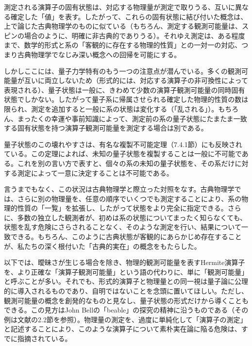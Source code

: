 測定される演算子の固有状態は、対応する物理量が測定で取りうる、互いに異なる確定した「値」を表す。したがって、これらの固有状態に結び付いた概念は、上で論じた古典物理学のものに似ている（もちろん、測定する観測可能量は、スピンの場合のように、明確に非古典的でありうる）。それゆえ測定は、ある程度まで、数学的形式と系の「客観的に存在する物理的性質」との一対一の対応、つまり古典物理学でなじみ深い概念への回帰を可能にする。

しかしここには、量子力学特有のもう一つの注意点が潜んでいる。多くの観測可能量が互いに両立しないため（形式的には、対応する演算子の非可換性によって表現される）、量子状態は一般に、きわめて少数の演算子観測可能量の同時固有状態でしかない。したがって量子系に帰属させられる確定した物理的性質の数は限られ、測定を追加すると一般に系の状態は変化する（「乱される」）。もちろん、まったくの幸運や事前知識によって、測定前の系の量子状態にたまたま一致する固有状態を持つ演算子観測可能量を測定する場合は別である。

\hypertarget{srcpage:16}{}\label{srcpage:16}
量子状態のこの壊れやすさは、有名な複製不可能定理（7.4.1節）にも反映されている。この定理によれば、未知の量子状態を複製することは一般に不可能である\cite{ref020,ref021}。これを別の言い方で表すと、個々の系の未知の量子状態を、その系だけに対する測定によって一意に決定することは不可能である\cite{ref022,ref023,ref024,ref025,ref026}。

言うまでもなく、この状況は古典物理学と際立った対照をなす。古典物理学では、さらに別の物理量を、任意の順序でいくつでも測定することにより、系の物理的性質の「一覧」を拡張し、したがって状態をより完全に指定できる。さらに、多数の独立した観測者が、初めは系の状態についてまったく知らなくても、状態を乱す危険にさらされることなく、そのような測定を行い、結果について一致できる。もちろん、このように古典状態が客観的にあらかじめ存在することが、私たちの深く根付いた「古典的実在」の概念をもたらした。

以下では、曖昧さが生じる場合を除き、物理的観測可能量を表すHermite演算子を、より正確な「演算子観測可能量」という語の代わりに、単に「観測可能量」と呼ぶことが多い。それでも、形式的演算子と物理量との同一視は量子論に公理的に導入されるものであり、自明ではないことを念頭に置いてほしい。ただし、観測可能量の概念を創発的なものと見なし、量子状態の形式だけから導くこともできる。この見方はJohn Bellの「beable」の探究\cite{ref027}の精神に沿うものである（その例は文献\cite{ref017}の2.2節を参照）。物理量の測定を、過度に単純化して「演算子の測定」と記述することにより、このような演算子について素朴実在論に陥る危険は、すでに指摘されている\cite{ref028}。

